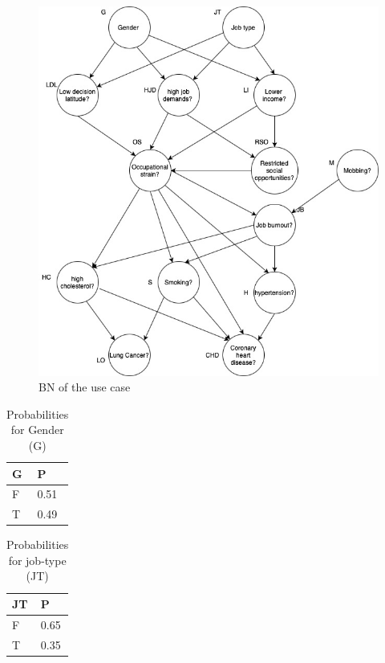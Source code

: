\begin{figure}[H]
    \includegraphics[width= 1.2\textwidth]{Assets/BN_diseases.jpg}
    \caption{BN of the use case}
    \label{fig:my_label}
\end{figure}

\begin{table}
\centering
\caption{Probabilities for Gender (G)}\label{tab1}
\begin{tabular}{p{1.2cm} p{1.2cm} }
\hline
G &  P\\
\hline
F &	0.51\\
T &	0.49\\
\hline
\end{tabular}
\end{table}

\begin{table}
\centering
\caption{Probabilities for job-type (JT)}\label{tab1}
\begin{tabular}{p{1.2cm} p{1.2cm} }
\hline
JT &  P\\
\hline
F &	0.65\\
T &	0.35\\
\hline
\end{tabular}
\end{table}

